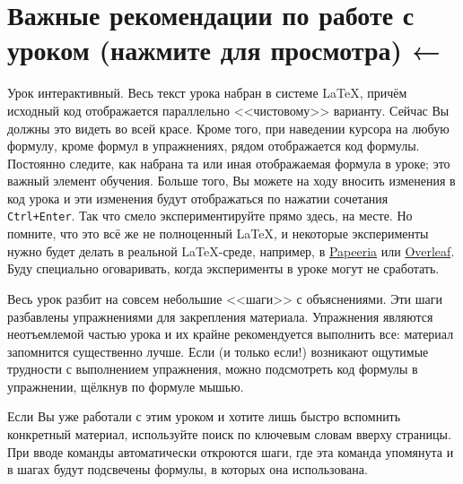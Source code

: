 \section{Важные рекомендации по работе с уроком (нажмите для просмотра) ←}
\par Урок интерактивный. Весь текст урока набран в системе \LaTeX, причём исходный код отображается параллельно <<чистовому>> варианту. Сейчас Вы должны это видеть во всей красе. Кроме того, при наведении курсора на любую формулу, кроме формул в упражнениях, рядом отображается код формулы. Постоянно следите, как набрана та или иная отображаемая формула в уроке; это важный элемент обучения. Больше того, Вы можете на ходу вносить изменения в код урока и эти изменения будут отображаться по нажатии сочетания \verb"Ctrl+Enter". Так что смело экспериментируйте прямо здесь, на месте. Но помните, что это всё же не полноценный \LaTeX, и некоторые эксперименты нужно будет делать в реальной \LaTeX-среде, например, в \href{https://papeeria.com/landing}{Papeeria} или \href{https://www.overleaf.com/index_b}{Overleaf}. Буду специально оговаривать, когда эксперименты в уроке могут не сработать.
\par Весь урок разбит на совсем небольшие <<шаги>> с объяснениями. Эти шаги разбавлены упражнениями для закрепления материала. Упражнения являются неотъемлемой частью урока и их крайне рекомендуется выполнить все: материал запомнится существенно лучше. Если (и только если!) возникают ощутимые трудности с выполнением упражнения, можно подсмотреть код формулы в упражнении, щёлкнув по формуле мышью.
\par Если Вы уже работали с этим уроком и хотите лишь быстро вспомнить конкретный материал, используйте поиск по ключевым словам вверху страницы. При вводе команды автоматически откроются шаги, где эта команда упомянута и в шагах будут подсвечены формулы, в которых она использована.